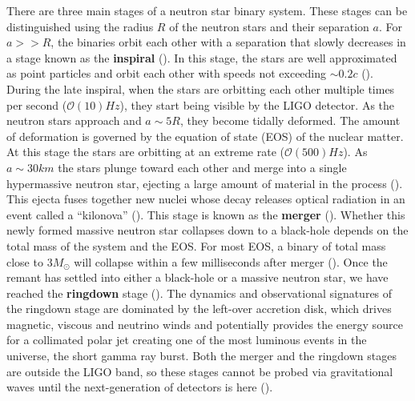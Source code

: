 There are three main stages of a neutron star binary system. These stages can be distinguished using the radius $R$ of the neutron stars and their separation $a$. For $a >> R$, the binaries orbit each other with a separation that slowly decreases in a stage known as the \textbf{inspiral} (\cite{faber2012binary,baumgarte2010numerical,shibata2015numerical,rezzolla2013relativistic}). In this stage, the stars are well approximated as point particles and orbit each other with speeds not exceeding $\sim 0.2c$ (\cite{shibata2015numerical}). During the late inspiral, when the stars are orbitting each other multiple times per second ($\mathcal{O}(10) Hz$), they start being visible by the LIGO detector. As the neutron stars approach and $a\sim 5R$, they become tidally deformed. The amount of deformation is governed by the equation of state (EOS) of the nuclear matter. At this stage the stars are orbitting at an extreme rate ($\mathcal{O}(500) Hz$). As $a \sim 30km$ the stars plunge toward each other and merge into a single hypermassive neutron star, ejecting a large amount of material in the process (\cite{shibata2015numerical}). This ejecta fuses together new nuclei whose decay releases optical radiation in an event called a ``kilonova'' (\cite{metzger:16}). This stage is known as the \textbf{merger} (\cite{faber2012binary,baumgarte2010numerical,shibata2015numerical,rezzolla2013relativistic}). Whether this newly formed massive neutron star collapses down to a black-hole depends on the total mass of the system and the EOS. For most EOS, a binary of total mass close to $3M_\odot$ will collapse within a few milliseconds after merger (\cite{bauswein2013prompt}). Once the remant has settled into either a black-hole or a massive neutron star, we have reached the \textbf{ringdown} stage (\cite{faber2012binary,baumgarte2010numerical,shibata2015numerical,rezzolla2013relativistic}). The dynamics and observational signatures of the ringdown stage are dominated by the left-over accretion disk, which drives magnetic, viscous and neutrino winds and potentially provides the energy source for a collimated polar jet creating one of the most luminous events in the universe, the short gamma ray burst. Both the merger and the ringdown stages are outside the LIGO band, so these stages cannot be probed via gravitational waves until the next-generation of detectors is here (\cite{Abbott:2017dke}).

